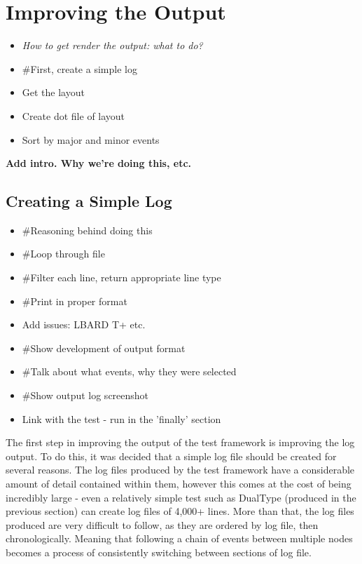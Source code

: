 
\chapter{Improving the Output} %

\label{Chapter5} %


\begin{itemize}
    \item \emph{How to get render the output: what to do?}
    \item \#First, create a simple log
    \item Get the layout
    \item Create dot file of layout
    \item Sort by major and minor events
\end{itemize}

\textbf{Add intro. Why we're doing this, etc.}

\section{Creating a Simple Log}
\begin{itemize}
    \item \#Reasoning behind doing this
    \item \#Loop through file
    \item \#Filter each line, return appropriate line type
    \item \#Print in proper format
    \item   Add issues: LBARD T+ etc.
    \item \#Show development of output format
    \item \#Talk about what events, why they were selected
    \item \#Show output log screenshot
    \item Link with the test - run in the 'finally' section
\end{itemize}

The first step in improving the output of the test framework is improving the log output.
To do this, it was decided that a simple log file should be created for several reasons.
The log files produced by the test framework have a considerable amount of detail contained within them, however this comes at the cost of being incredibly large - even a relatively simple test such as DualType (produced in the previous section) can create log files of 4,000+ lines.
More than that, the log files produced are very difficult to follow, as they are ordered by log file, then chronologically.
Meaning that following a chain of events between multiple nodes becomes a process of consistently switching between sections of log file.


